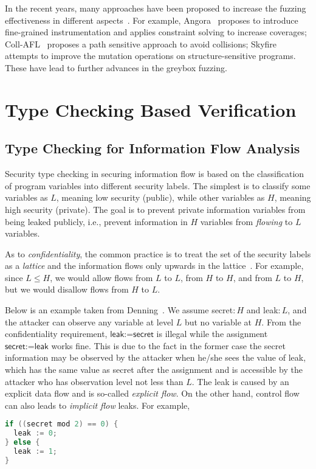 In the recent years, many approaches have been proposed to increase the fuzzing effectiveness in different aspects~\cite{Bohme:2016:CGF,LiCMLLT17,Bohme:2017:DGF,FairFuzz,CollAFL,Angora,nezha,fuzz_survey}. For example, Angora~\cite{Angora} proposes to introduce fine-grained instrumentation and applies constraint solving to increase coverages; Coll-AFL~\cite{CollAFL} proposes a path sensitive approach to avoid collisions; Skyfire~\cite{junjie:2017sp:skyfire} attempts to improve the mutation operations on structure-sensitive programs. These have lead to further advances in the greybox fuzzing.

\section{Type Checking Based Verification}\label{sec:intro-sta}

\subsection{Type Checking for Information Flow Analysis}

Security type checking in securing information flow is based on the classification of program variables into different security labels. The simplest is to classify some variables as $L$, meaning low security (public), while other variables as $H$, meaning high security (private). The goal is to prevent private information variables from being leaked publicly, i.e., prevent information in $H$ variables from \emph{flowing} to $L$ variables.

As to \emph{confidentiality}, the common practice is to treat the set of the security labels as a  \emph{lattice} and the information flows only upwards in the lattice~\cite{Denning:1977hwa}. For example, since $L\leq H$, we would allow flows from $L$ to $L$, from $H$ to $H$, and from $L$ to $H$, but we would disallow flows from $H$ to $L$.

Below is an example taken from Denning~\cite{Denning:1976cl}. We assume \textsf{secret}$:H$ and \textsf{leak}$:L$, and the attacker can observe any variable at level $L$ but no variable at $H$.
From the confidentiality requirement, $\textsf{leak:=secret}$ is illegal while the assignment $\textsf{secret:=leak}$ works fine. This is due to the fact in the former case the secret information may be observed by the attacker when he/she sees the value of \textsf{leak}, which has the same value as \textsf{secret} after the assignment and is accessible by the attacker who has observation level not less than $L$. The leak is caused by an explicit data flow and is so-called \emph{explicit flow}. On the other hand, control flow can also leads to \emph{implicit flow} leaks. For example,
\begin{lstlisting}[language=c]
if ((secret mod 2) == 0) {
  leak := 0;
} else {
  leak := 1;	
}  
\end{lstlisting}

